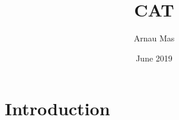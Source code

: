 \documentclass{article}
\title{CAT}
\author{Arnau Mas}
\date{June 2019}
\begin{document}
\maketitle

\section{Introduction}
\end{document}
